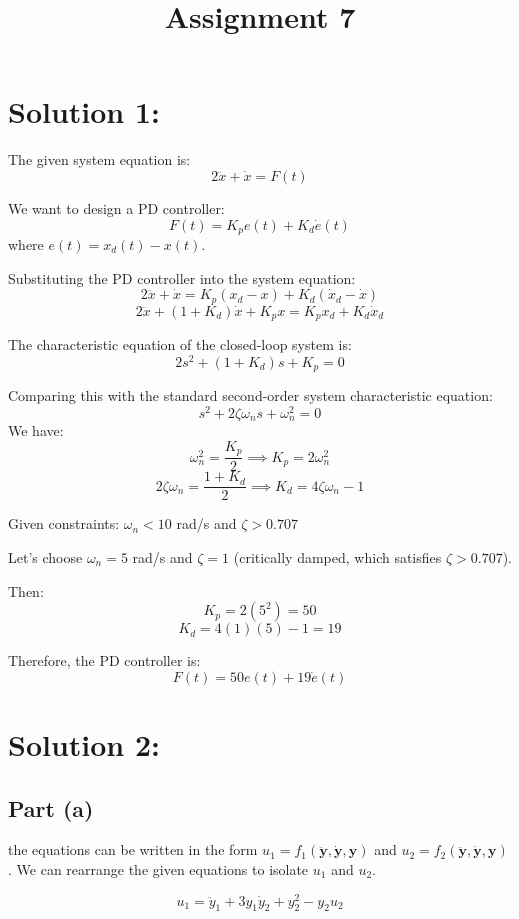 \documentclass{article}
\begin{document}
\title{Assignment 7}
\date{}
\maketitle

\section{Solution 1:}

The given system equation is:
\[
2\ddot{x} + \dot{x} = F(t)
\]

We want to design a PD controller:
\[
F(t) = K_p e(t) + K_d \dot{e}(t)
\]
where $e(t) = x_d(t) - x(t)$.

Substituting the PD controller into the system equation:
\[
2\ddot{x} + \dot{x} = K_p (x_d - x) + K_d (\dot{x}_d - \dot{x})
\]
\[
2\ddot{x} + (1 + K_d)\dot{x} + K_p x = K_p x_d + K_d \dot{x}_d
\]

The characteristic equation of the closed-loop system is:
\[
2s^2 + (1 + K_d)s + K_p = 0
\]

Comparing this with the standard second-order system characteristic equation:
\[
s^2 + 2\zeta\omega_n s + \omega_n^2 = 0
\]
We have:
\[
\omega_n^2 = \frac{K_p}{2} \implies K_p = 2\omega_n^2
\]
\[
2\zeta\omega_n = \frac{1 + K_d}{2} \implies K_d = 4\zeta\omega_n - 1
\]

Given constraints: $\omega_n < 10$ rad/s and $\zeta > 0.707$

Let's choose $\omega_n = 5$ rad/s and $\zeta = 1$ (critically damped, which satisfies $\zeta > 0.707$).

Then:
\[
K_p = 2 (5^2) = 50
\]
\[
K_d = 4 (1) (5) - 1 = 19
\]

Therefore, the PD controller is:
\[
F(t) = 50 e(t) + 19 \dot{e}(t)
\]

\section{Solution 2:}

\subsection{Part (a)}

the equations can be written in the form $u_1 = f_1(\ddot{\mathbf{y}}, \dot{\mathbf{y}}, \mathbf{y})$ and $u_2 = f_2(\ddot{\mathbf{y}}, \dot{\mathbf{y}}, \mathbf{y})$. We can rearrange the given equations to isolate $u_1$ and $u_2$.

\[
u_1 = \ddot{y}_1 + 3y_1\dot{y}_2 + y_2^2 - y_2 u_2
\]
\end{document}
